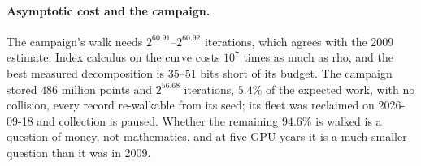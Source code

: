 \paragraph{Asymptotic cost and the campaign.} The campaign's walk needs $2^{60.91}$--$2^{60.92}$ iterations,
which agrees with the 2009 estimate. Index calculus on the curve costs
$10^7$ times as much as rho, and the best measured decomposition is
$35$--$51$ bits short of its budget. The campaign stored $486$ million
points and $2^{56.68}$ iterations, $5.4\%$ of the expected work, with no
collision, every record re-walkable from its seed; its fleet was
reclaimed on 2026-09-18 and collection is paused. Whether the remaining
$94.6\%$ is walked is a question of money, not mathematics, and at five
GPU-years it is a much smaller question than it was in 2009.
